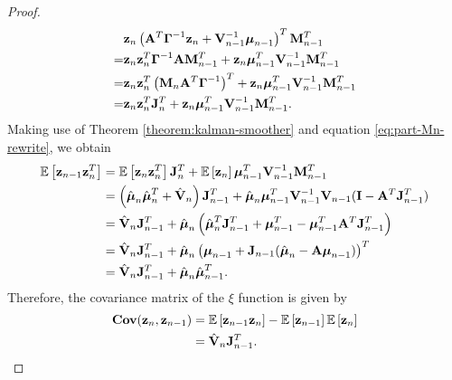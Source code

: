 \documentclass[11pt]{article}
\numberwithin{equation}{section}
\newcommand{\expectation}[1]{\mathbb{E}\left[#1\right]}
\newcommand{\z}{{\bf z}}
\begin{document}
\begin{proof}
\begin{align}
		&\z_n \left({\bf A}^T\boldsymbol\Gamma^{-1}\z_{n} + {\bf V}_{n-1}^{-1}\boldsymbol\mu_{n-1}\right)^T {\bf M}_{n-1}^T \\
		=& \z_n \z_n^T \boldsymbol{\Gamma}^{-1}{\bf A} {\bf M}_{n-1}^T + \z_n \boldsymbol{\mu}_{n-1}^T {\bf V}_{n-1}^{-1}{\bf M}_{n-1}^T\\
		=& \z_n \z_n^T \left({\bf M}_n {\bf A}^T \boldsymbol\Gamma^{-1}\right)^T + \z_n \boldsymbol{\mu}_{n-1}^T {\bf V}_{n-1}^{-1}{\bf M}_{n-1}^T\\
		=& \z_n\z_n^T {\bf J}_n^T + \z_n \boldsymbol{\mu}_{n-1}^T {\bf V}_{n-1}^{-1}{\bf M}_{n-1}^T.
	\end{align}
	Making use of Theorem \ref{theorem:kalman-smoother} and equation \eqref{eq:part-Mn-rewrite}, we obtain
	\begin{align}
		\expectation{\z_{n-1}\z_n^T} &= \expectation{\z_n\z_n^T} {\bf J}_n^T + \expectation{\z_n}\boldsymbol{\mu}_{n-1}^T {\bf V}_{n-1}^{-1}{\bf M}_{n-1}^T\\
		&= \left(\hat{\boldsymbol{\mu}}_n\hat{\boldsymbol{\mu}}_n^T + \hat{\bf V}_n \right){\bf J}_{n-1}^T + \hat{\boldsymbol{\mu}}_n \boldsymbol{\mu}_{n-1}^T {\bf V}_{n-1}^{-1} {\bf V}_{n-1}({\bf I} - {\bf A}^T{\bf J}_{n-1}^T)\\
		&= \hat{\bf V}_n {\bf J}_{n-1}^T + \hat{\boldsymbol{\mu}}_n\left(\hat{\boldsymbol{\mu}}_n^T{\bf J}_{n-1}^T + \boldsymbol{\mu}_{n-1}^T - \boldsymbol{\mu}_{n-1}^T{\bf A}^T{\bf J}_{n-1}^T \right)\\
		&= \hat{\bf V}_n {\bf J}_{n-1}^T + \hat{\boldsymbol{\mu}}_n\left( \boldsymbol{\mu}_{n-1} + {\bf J}_{n-1} (\hat{\boldsymbol{\mu}}_n - {\bf A}\boldsymbol{\mu}_{n-1})\right)^T\\
		&= \hat{\bf V}_n {\bf J}_{n-1}^T + \hat{\boldsymbol{\mu}}_n \hat{\boldsymbol{\mu}}_{n-1}^T.
	\end{align}
	Therefore, the covariance matrix of the $\xi$ function is given by
	\begin{align}
		{\bf Cov}(\z_n, \z_{n-1}) &= \expectation{\z_{n-1}\z_{n}} - \expectation{\z_{n-1}}\expectation{\z_{n}}\\
		&= \hat{\bf V}_n {\bf J}_{n-1}^T.
	\end{align}
\end{proof}
\end{document}
